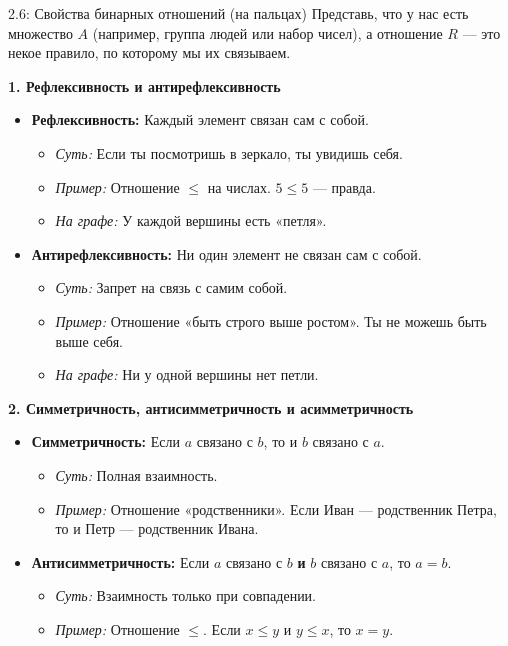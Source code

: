 \documentclass[a4paper,12pt]{article}
\begin{document}
\begin{definitionbox}{2.6: Свойства бинарных отношений (на пальцах)}
	Представь, что у нас есть множество $A$ (например, группа людей или набор чисел), а отношение $R$ — это некое правило, по которому мы их связываем.
	
	\textbf{1. Рефлексивность и антирефлексивность}
	\begin{itemize}
		\item \textbf{Рефлексивность:} Каждый элемент связан сам с собой.
		\begin{itemize}
			\item \textit{Суть:} Если ты посмотришь в зеркало, ты увидишь себя.
			\item \textit{Пример:} Отношение $\le$ на числах. $5 \le 5$ — правда.
			\item \textit{На графе:} У каждой вершины есть «петля».
		\end{itemize}
		
		\item \textbf{Антирефлексивность:} Ни один элемент не связан сам с собой.
		\begin{itemize}
			\item \textit{Суть:} Запрет на связь с самим собой.
			\item \textit{Пример:} Отношение «быть строго выше ростом». Ты не можешь быть выше себя.
			\item \textit{На графе:} Ни у одной вершины нет петли.
		\end{itemize}
	\end{itemize}
	
	\textbf{2. Симметричность, антисимметричность и асимметричность}
	\begin{itemize}
		\item \textbf{Симметричность:} Если $a$ связано с $b$, то и $b$ связано с $a$.
		\begin{itemize}
			\item \textit{Суть:} Полная взаимность.
			\item \textit{Пример:} Отношение «родственники». Если Иван — родственник Петра, то и Петр — родственник Ивана.
		\end{itemize}
		
		\item \textbf{Антисимметричность:} Если $a$ связано с $b$ \textbf{и} $b$ связано с $a$, то $a = b$.
		\begin{itemize}
			\item \textit{Суть:} Взаимность только при совпадении.
			\item \textit{Пример:} Отношение $\le$. Если $x \le y$ и $y \le x$, то $x = y$.
		\end{itemize}
		

\end{itemize}
\end{definitionbox}
\end{document}
